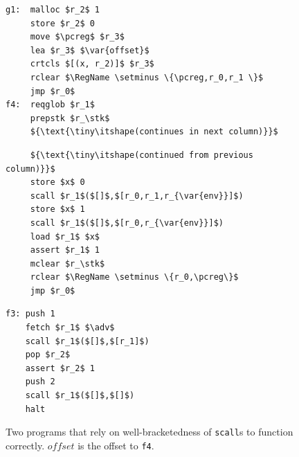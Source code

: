 \documentclass[format=acmsmall, review=true, screen=true]{acmart}
\newcommand{\var}[1]{\mathit{#1}}
\newcommand{\pcreg}{\mathrm{pc}}
\newcommand{\adv}{\var{adv}}
\newcommand{\stk}{\var{stk}}
\newcommand{\plaindom}[1]{\mathrm{#1}}
\newcommand{\RegName}{\plaindom{RegName}}
\begin{document}

\begin{figure}[t]
  \centering
  \begin{minipage}[t]{.37\linewidth}
  \begin{lstlisting}
g1:  malloc $r_2$ 1
     store $r_2$ 0
     move $\pcreg$ $r_3$
     lea $r_3$ $\var{offset}$
     crtcls $[(x, r_2)]$ $r_3$
     rclear $\RegName \setminus \{\pcreg,r_0,r_1 \}$
     jmp $r_0$
f4:  reqglob $r_1$
     prepstk $r_\stk$
     ${\text{\tiny\itshape(continues in next column)}}$
\end{lstlisting}
  \end{minipage}%
  \begin{minipage}[t]{.37\linewidth}
\begin{lstlisting}
     ${\text{\tiny\itshape(continued from previous column)}}$
     store $x$ 0
     scall $r_1$($[]$,$[r_0,r_1,r_{\var{env}}]$)
     store $x$ 1
     scall $r_1$($[]$,$[r_0,r_{\var{env}}]$)
     load $r_1$ $x$
     assert $r_1$ 1
     mclear $r_\stk$
     rclear $\RegName \setminus \{r_0,\pcreg\}$
     jmp $r_0$
\end{lstlisting}
  \end{minipage}%
  \begin{minipage}[t]{.25\linewidth}
  \begin{lstlisting}
f3: push 1
    fetch $r_1$ $\adv$
    scall $r_1$($[]$,$[r_1]$)
    pop $r_2$
    assert $r_2$ 1
    push 2
    scall $r_1$($[]$,$[]$)
    halt
\end{lstlisting}
  \end{minipage}
  \caption{ Two programs that rely on well-bracketedness of
    \texttt{scall}s to function correctly. $\var{offset}$ is the
    offset to \texttt{f4}.}
  \label{fig:prog-f3-and-g1}
\end{figure}
\end{document}
